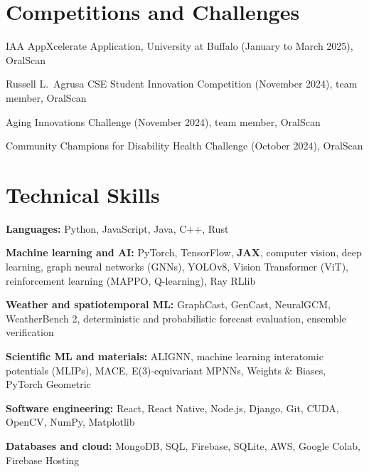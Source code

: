 \documentclass[11pt,a4paper]{article}
\begin{document}
\section*{Competitions and Challenges}
\begin{cvlist}
  \item IAA AppXcelerate Application, University at Buffalo (January to March 2025), OralScan
  \item Russell L.\ Agrusa CSE Student Innovation Competition (November 2024), team member, OralScan
  \item Aging Innovations Challenge (November 2024), team member, OralScan
  \item Community Champions for Disability Health Challenge (October 2024), OralScan
\end{cvlist}

\section*{Technical Skills}
\begin{cvlist}
  \item \textbf{Languages:} Python, JavaScript, Java, C++, Rust
  \item \textbf{Machine learning and AI:} PyTorch, TensorFlow, \textbf{JAX}, computer vision, deep learning, graph neural networks (GNNs), YOLOv8, Vision Transformer (ViT), reinforcement learning (MAPPO, Q-learning), Ray RLlib
  \item \textbf{Weather and spatiotemporal ML:} GraphCast, GenCast, NeuralGCM, WeatherBench 2, deterministic and probabilistic forecast evaluation, ensemble verification
  \item \textbf{Scientific ML and materials:} ALIGNN, machine learning interatomic potentials (MLIPs), MACE, E(3)-equivariant MPNNs, Weights \& Biases, PyTorch Geometric
  \item \textbf{Software engineering:} React, React Native, Node.js, Django, Git, CUDA, OpenCV, NumPy, Matplotlib
  \item \textbf{Databases and cloud:} MongoDB, SQL, Firebase, SQLite, AWS, Google Colab, Firebase Hosting
\end{cvlist}

\end{document}
